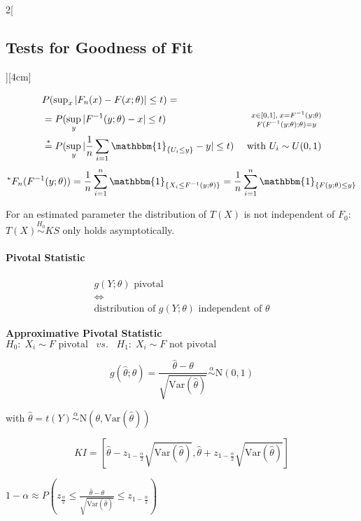 \documentclass[8pt]{extarticle}
\begin{document}
\begin{multicols}{2}[\subsection{Tests for Goodness of Fit}][4cm]
\begin{Proof}
\vspace{-1em}
\begin{align*}
\intertext{$P(\sup_x |F_n(x) - F(x;\theta)|\leq t) = $}
&= P(\sup_y |F^{-1}(y;\theta) - x|\leq t) & \substack{x\in\left[0,1\right],\: x {=} F^{-1}(y;\theta)\\ F(F^{-1}(y;\theta);\theta){=}y}\\
&\overset{*}{=} P(\sup_y |\frac{1}{n}\sum_{i=1} \mathbbm{1}_{\{U_i\leq y\}} - y|\leq t) & \text{ with } U_i \sim U(0,1)
\end{align*}
$$^*F_n(F^{{-}1}(y;\theta)) = \frac{1}{n}\sum_{i=1}^n\mathbbm{1}_{\{X_i\leq F^{{-}1}(y;\theta)\}}  = \frac{1}{n}\sum_{i=1}^n\mathbbm{1}_{\{F(y;\theta) \leq y\}}$$
\end{Proof}

\noindent For an estimated parameter the distribution of $T(X)$ is not independent of $F_0$: $T(X) \overset{H_0}{\sim} KS$ only holds asymptotically.

\paragraph{Pivotal Statistic}

$$\begin{gathered}
g(Y;\theta) \text{ pivotal}\\
\Leftrightarrow \\
\text{distribution of } g(Y;\theta) \text{ independent of } \theta
\end{gathered}$$

\textbf{Approximative Pivotal Statistic}
\indent $H_0\!:\; X_i \sim F \text{ pivotal} \;\;\; vs. \;\;\; H_1\!:\; X_i \sim F \text{ not pivotal }$

$$g(\hat{\theta};\theta) = \frac{\hat{\theta} - \theta}{\sqrt{\textrm{Var}(\hat{\theta})}} \overset{\alpha}{\sim} \mathrm{N}(0,1)$$

with $\hat{\theta} = t(Y) \overset{\alpha}{\sim} \mathrm{N}(\theta,\mathrm{Var}(\hat{\theta}))$

$$KI = \left[ \hat{\theta} - z_{1-\frac{\alpha}{2}}\sqrt{\mathrm{Var}(\hat{\theta})}, \hat{\theta} + z_{1-\frac{\alpha}{2}}\sqrt{\mathrm{Var}(\hat{\theta})} \right]$$

\begin{Proof}
$1-\alpha \approx P \left( z_{\frac{\alpha}{2}} \leq \frac{\hat{\theta} - \theta}{\sqrt{\textrm{Var}(\hat{\theta})}} \leq z_{1-\frac{\alpha}{2}}\right)$
\end{Proof}


\end{multicols}
\end{document}

